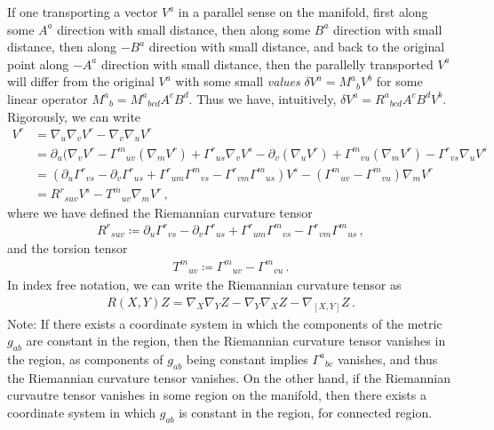 \documentclass[11pt, onesided]{book}
\theoremstyle{break}
\theoremstyle{break}
\newcommand{\pd}{\partial}
\newcommand{\note}{\color{red}Note: \color{black}}
\begin{document}
If one transporting a vector $V^a$ in a parallel sense on the manifold, first along some $A^a$ direction with small distance, then along some $B^a$ direction with small distance, then along $-B^a$ direction with small distance, and back to the original point along $-A^a$ direction with small distance, then the parallelly transported $V^a$ will differ from the original $V^a$ with some small \textit{values} $\delta V^a = M^a{}_bV^b$ for some linear operator $M^a{}_b = M^a{}_{bcd} A^cB^d$. Thus we have, intuitively, $\delta V^a = R^a{}_{bcd}A^cB^dV^b$. \\

Rigorously, we can write
\begin{align*}
[\nabla_u, \nabla_v] V^r &= \nabla_u \nabla_v V^r - \nabla_v \nabla_u V^r\\
&=\pd_u(\nabla_v V^r - \Gamma^{m}{}_{uv}(\nabla_m V^r) + \Gamma^r{}_{us}\nabla_v V^s- \pd_v (\nabla_u V^r) + \Gamma^m{}_{vu} (\nabla_m V^r) - \Gamma^r{}_{vs} \nabla_uV^s\\
&=\left( \pd_u \Gamma^r{}_{vs} - \pd_v \Gamma^r{}_{us} + \Gamma^r{}_{um} \Gamma^m{}_{vs} - \Gamma^r{}_{vm} \Gamma^m{}_{us} \right) V^s - \left(\Gamma^m{}_{uv} - \Gamma^m{}_{vu} \right)\nabla_m V^r\\
&= R^{r}{}_{suv}V^s - T^m{}_{uv} \nabla_m V^r\,,
\end{align*} 
where we have defined the Riemannian curvature tensor
\begin{align*}
R^{r}{}_{suv} \coloneqq \pd_u \Gamma^r{}_{vs} - \pd_v \Gamma^r{}_{us} + \Gamma^r{}_{um} \Gamma^m{}_{vs} - \Gamma^r{}_{vm} \Gamma^m{}_{us}\,,
\end{align*}
and the torsion tensor
\begin{align*}
 T^m{}_{uv}  \coloneqq \Gamma^m{}_{uv} - \Gamma^m{}_{vu}\,.
\end{align*}
In index free notation, we can write the Riemannian curvature tensor as
\begin{align*}
R(X,Y)Z = \nabla_X\nabla_Y Z - \nabla_Y \nabla_X Z - \nabla_{[X,Y]}Z\,.
\end{align*}
\note If there exists a coordinate system in which the components of the metric $g_{ab}$ are constant in the region, then the Riemannian curvature tensor vanishes in the region, as components of $g_{ab}$ being constant implies $\Gamma^{a}{}_{bc}$ vanishes, and thus the Riemannian curvature tensor vanishes. On the other hand, if the Riemannian curvautre tensor vanishes in some region on the manifold, then there exists a coordinate system in which $g_{ab}$ is constant in the region, for connected region. \\
\end{document}
